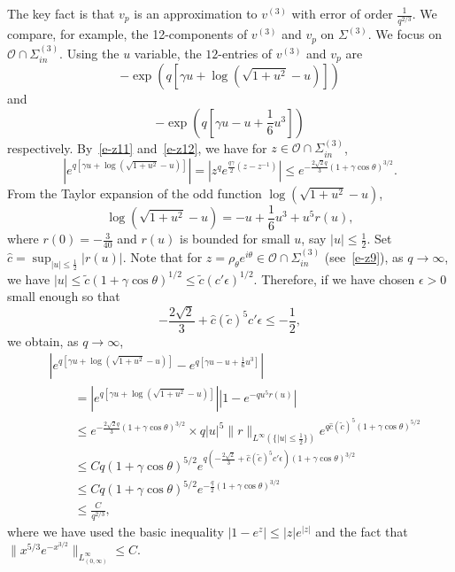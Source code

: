 \documentclass{amsart}
\theoremstyle{definition}
\theoremstyle{remark}
\numberwithin{equation}{section}
\newcommand{\wt}{\widetilde}
\begin{document}
The key fact is that $v_p$ is an approximation to  
$v^{(3)}$ with error of order $\frac{1}{q^{2/3}}$. 
We compare, for example, the 12-components of $v^{(3)}$ and 
$v_p$ on $\Sigma^{(3)}$.
We focus on $\mathcal{O}\cap\Sigma_{in}^{(3)}$.
Using the $u$ variable, the $12$-entries of $v^{(3)}$ and $v_p$ are 
$$-\exp(q[\gamma u+\log(\sqrt{1+u^2}-u)])$$ 
and $$-\exp(q[\gamma u-u+\frac16u^3])$$
respectively.
By~\eqref{e-z11} and~\eqref{e-z12}, we have for 
$z\in\mathcal{O}\cap\Sigma_{in}^{(3)}$, 
\begin{equation*}
  |e^{q[\gamma u+\log(\sqrt{1+u^2}-u)]}|
=|z^qe^{\frac{q\gamma}2(z-z^{-1})}|\le
e^{-\frac{2\sqrt{2}q}{3}(1+\gamma\cos\theta)^{3/2}}.
\end{equation*}
From the Taylor expansion of the odd function $\log(\sqrt{1+u^2}-u)$, 
$$\log(\sqrt{1+u^2}-u)=-u+\frac16u^3+u^5r(u),$$
where $r(0)=-\frac3{40}$ and $r(u)$ is bounded for small $u$, 
say $|u|\le\frac12$.
Set $\hat{c}=\sup_{|u|\le\frac12} |r(u)|$.
Note that for $z=\rho_{\theta}e^{i\theta}
\in\mathcal{O}\cap\Sigma^{(3)}_{in}$ (see~\eqref{e-z9}), 
as $q\to\infty$, we have 
$|u|\leq \wt{c}(1+\gamma \cos \theta)^{1/2}\le \wt{c}(c'\epsilon)^{1/2}$.
Therefore, if we have chosen $\epsilon>0$ small enough 
so that 
\begin{equation}\label{e-z20}
  -\frac{2\sqrt{2}}3+\hat{c}(\wt{c})^5c'\epsilon\le -\frac12, 
\end{equation}
we obtain, as $q\to\infty$,
\begin{equation}\label{e-z14}
 \begin{split}
   &|e^{q[\gamma u+\log(\sqrt{1+u^2}-u)]}-e^{q[\gamma u-u+\frac16u^3]}| \\
   &\qquad = |e^{q[\gamma u+\log(\sqrt{1+u^2}-u)]}||1-e^{-qu^5r(u)}| \\
   &\qquad \leq e^{-\frac{2\sqrt{2}q}3(1+\gamma \cos \theta)^{3/2}}\times 
q|u|^5\|r\|_{L^\infty(\{|u|\le\frac12\})}
e^{q\hat{c}(\wt{c})^5(1+\gamma \cos \theta)^{5/2}} \\
   &\qquad \leq Cq(1+\gamma \cos \theta)^{5/2}
e^{q(-\frac{2\sqrt{2}}3+\hat{c}(\wt{c})^5c'\epsilon)(1+\gamma \cos \theta)^{3/2}} \\
   &\qquad \leq Cq(1+\gamma \cos \theta)^{5/2} 
e^{-\frac{q}2(1+\gamma \cos \theta)^{3/2}} \\
   &\qquad \leq \frac{C}{q^{2/3}},
 \end{split}
\end{equation}
where we have used the basic inequality 
$|1-e^z|\le |z|e^{|z|}$ and the fact that 
$\|x^{5/3}e^{-x^{3/2}}\|_{L^{\infty}_{(0,\infty)}} \le C$.
\end{document}
